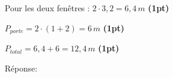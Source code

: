 \begin{parts}
\begin{solutionorgrid}[180pt]
\vspace{5pt}
Pour les deux fenêtres : $2\cdot 3,2 = 6,4\,m$ \hfill \textbf{(1pt)}

\vspace{5pt}
$P_{porte} = 2\cdot(1+2) = 6\,m$ \hfill \textbf{(1pt)}

\vspace{5pt}
$P_{total} = 6,4 + 6 = 12,4\,m$ \hfill \textbf{(1pt)}
\end{solutionorgrid}

\begin{tcolorbox}[enhanced jigsaw, interior hidden, colframe=box, parbox=false]%
Réponse: 
\end{tcolorbox}
\end{parts}